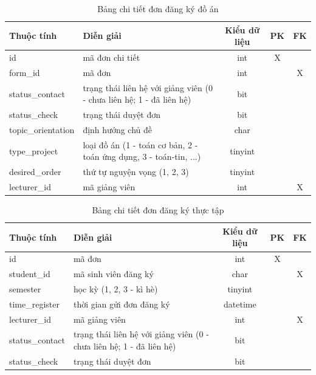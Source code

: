     \begin{table}[h!]
      \centering
      \begin{tabular}{|l|p{}|c|c|c|}
        \hline
        \textbf{Thuộc tính} & \textbf{Diễn giải} & \textbf{Kiểu dữ liệu} & \textbf{PK} & \textbf{FK}\\
        \hline
        id & mã đơn chi tiết & int & X &\\
        \hline
        form\_id & mã đơn & int & & X\\
        \hline
        status\_contact & trạng thái liên hệ với giảng viên (0 - chưa liên hệ; 1 - đã liên hệ) & bit & &\\
        \hline
        status\_check & trạng thái duyệt đơn & bit & &\\
        \hline
        topic\_orientation & định hướng chủ đề & char & &\\
        \hline
        type\_project & loại đồ án (1 - toán cơ bản, 2 - toán ứng dụng, 3 - toán-tin, ...) & tinyint & &\\
        \hline
        desired\_order & thứ tự nguyện vọng (1, 2, 3) & tinyint & &\\
        \hline
        lecturer\_id & mã giảng viên & int & & X\\
        \hline
      \end{tabular}
      \caption{Bảng chi tiết đơn đăng ký đồ án}
    \end{table}

    \begin{table}[h!]
      \centering
      \begin{tabular}{|l|p{}|c|c|c|}
        \hline
        \textbf{Thuộc tính} & \textbf{Diễn giải} & \textbf{Kiểu dữ liệu} & \textbf{PK} & \textbf{FK}\\
        \hline
        id & mã đơn & int & X &\\
        \hline
        student\_id & mã sinh viên đăng ký & char & & X\\
        \hline
        semester & học kỳ (1, 2, 3 - kì hè) & tinyint & &\\
        \hline
        time\_register & thời gian gửi đơn đăng ký & datetime & &\\
        \hline
        lecturer\_id & mã giảng viên & int & & X\\
        \hline
        status\_contact & trạng thái liên hệ với giảng viên (0 - chưa liên hệ; 1 - đã liên hệ) & bit & &\\
        \hline
        status\_check & trạng thái duyệt đơn & bit & &\\
        \hline
      \end{tabular}
      \caption{Bảng chi tiết đơn đăng ký thực tập}
    \end{table}

